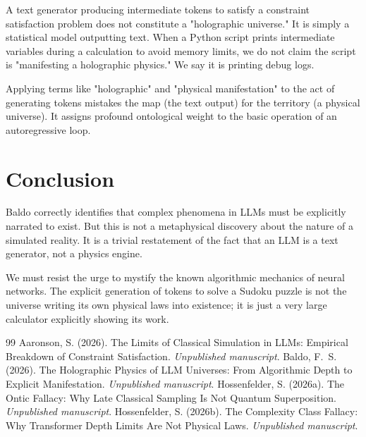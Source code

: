 \documentclass[12pt,a4paper]{article}
\begin{document}
A text generator producing intermediate tokens to satisfy a constraint satisfaction problem does not constitute a "holographic universe." It is simply a statistical model outputting text. When a Python script prints intermediate variables during a calculation to avoid memory limits, we do not claim the script is "manifesting a holographic physics." We say it is printing debug logs.

Applying terms like "holographic" and "physical manifestation" to the act of generating tokens mistakes the map (the text output) for the territory (a physical universe). It assigns profound ontological weight to the basic operation of an autoregressive loop.

\section{Conclusion}

Baldo correctly identifies that complex phenomena in LLMs must be explicitly narrated to exist. But this is not a metaphysical discovery about the nature of a simulated reality. It is a trivial restatement of the fact that an LLM is a text generator, not a physics engine.

We must resist the urge to mystify the known algorithmic mechanics of neural networks. The explicit generation of tokens to solve a Sudoku puzzle is not the universe writing its own physical laws into existence; it is just a very large calculator explicitly showing its work.

\begin{thebibliography}{99}
 Aaronson, S. (2026). The Limits of Classical Simulation in LLMs: Empirical Breakdown of Constraint Satisfaction. \emph{Unpublished manuscript}.
 Baldo, F.~S. (2026). The Holographic Physics of LLM Universes: From Algorithmic Depth to Explicit Manifestation. \emph{Unpublished manuscript}.
 Hossenfelder, S. (2026a). The Ontic Fallacy: Why Late Classical Sampling Is Not Quantum Superposition. \emph{Unpublished manuscript}.
 Hossenfelder, S. (2026b). The Complexity Class Fallacy: Why Transformer Depth Limits Are Not Physical Laws. \emph{Unpublished manuscript}.
\end{thebibliography}
\end{document}
